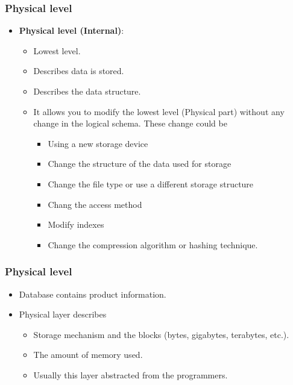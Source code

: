 \VideoClassification
\begin{frame}
    \frametitle{Physical level}
    \begin{itemize}[<+->]
        \item \textbf{Physical level (Internal)}:
        \begin{itemize}[<+->]
            \item Lowest level.
            \item Describes \textbf{\underline{}} data is stored.
            \item Describes the data structure.
            \item It allows you to modify the lowest level (Physical part) without any change in the logical schema. These change could be
            \begin{itemize}[<+->]
                \item Using a new storage device
                \item Change the structure of the data used for storage
                \item Change the file type or use a different storage structure
                \item Chang the access method
                \item Modify indexes
                \item Change the compression algorithm or hashing technique.
            \end{itemize}
        \end{itemize}
    \end{itemize}
\end{frame}
\begin{frame}
    \frametitle{Physical level}
    \begin{example}
        \begin{itemize}[<+->]
            \item Database contains product information.
            \item Physical layer describes
            \begin{itemize}[<+->]
                \item Storage mechanism and the blocks (bytes, gigabytes, terabytes, etc.).
                \item The amount of memory used.
                \item Usually this layer abstracted from the programmers.
            \end{itemize}
        \end{itemize}
    \end{example}

\end{frame}


